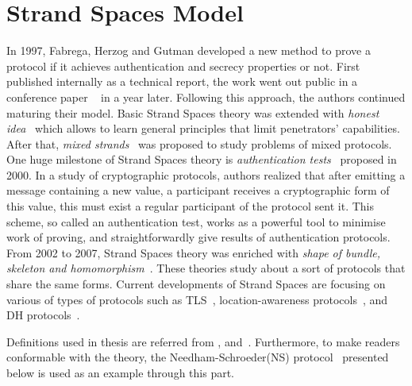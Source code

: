 
\chapter{Strand Spaces Model} %

\label{Strand Spaces Model} %


In 1997, Fabrega, Herzog and Gutman developed a new method to prove a protocol if it achieves authentication and secrecy properties or not. First published internally as a technical report, the work went out public in a conference paper ~\cite{674832} in a year later. Following this approach, the authors continued maturing their model. Basic Strand Spaces theory was extended with \emph{honest idea}~\cite{Thayer:1998:HIS:794198.795096} which allows to learn general principles that limit penetrators' capabilities. After that, \emph{mixed strands}~\cite{Thayer:1999:MSS:794199.795113} was proposed to study problems of mixed protocols. One huge milestone of Strand Spaces theory is \emph{authentication tests}~\cite{Guttman:2002:ATS:568264.568267} proposed in 2000. In a study of cryptographic protocols, authors realized that after emitting a message containing a new value, a participant receives a cryptographic form of this value, this must exist a regular participant of the protocol sent it. This scheme, so called an authentication test, works as a powerful tool to minimise work of proving, and straightforwardly give results of authentication protocols. From 2002 to 2007, Strand Spaces theory was enriched with \emph{shape of bundle, skeleton and homomorphism}~\cite{Doghmi:2007:SHS:1230146.1230260}. These theories study about a sort of protocols that share the same forms. Current developments of Strand Spaces are focusing on various of types of protocols such as TLS~\cite{Kamil:2011:ATS:2590701.2590707}, location-awareness protocols~\cite{Thayer:2010aa}, and DH protocols~\cite{1212716}. 

Definitions used in thesis are referred from \cite{674832}, \cite{Guttman:2002:ATS:568264.568267} and~\cite{Doghmi:2007:SHS:1230146.1230260}. Furthermore, to make readers conformable with the theory, the Needham-Schroeder(NS) protocol~\cite{Needham:1978:UEA:359657.359659} presented below is used as an example through this part. 

